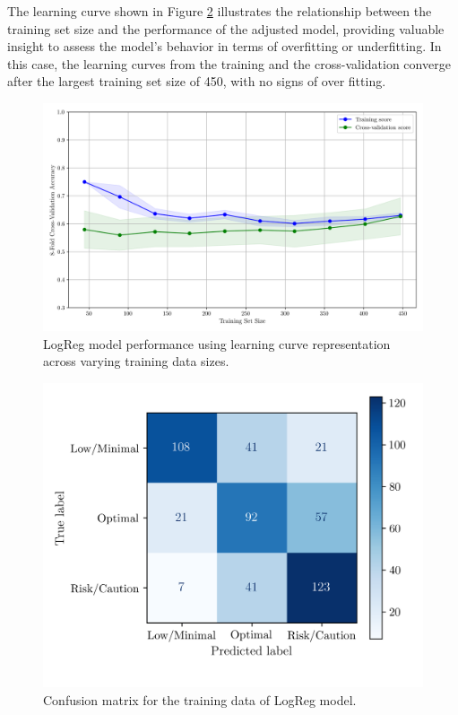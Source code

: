 \documentclass[conference]{IEEEtran}
\begin{document}

The learning curve shown in Figure \ref{cf_train_LogReg} illustrates the relationship between the training set size and the performance of the adjusted model, providing valuable insight to assess the model's behavior in terms of overfitting or underfitting. In this case, the learning curves from the training and the cross-validation converge after the largest training set size of 450, with no signs of over fitting.

\begin{figure}[H]
    \centering
    \includegraphics[width=1\linewidth]{assets/LOGR_lercurve.png}
    \caption{LogReg model performance using learning curve representation across varying training data sizes.}
    \label{lcLogReg}
\end{figure}

\begin{figure}[H]
    \centering
    \includegraphics[width=1\linewidth]{assets/LOGR_confmatTrain.png}
    \caption{Confusion matrix for the training data of LogReg model.}
    \label{cf_train_LogReg}
\end{figure}
\end{document}
